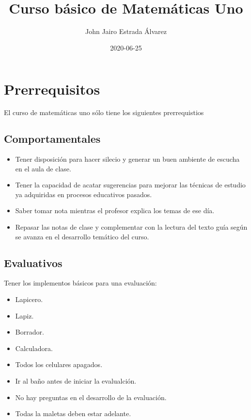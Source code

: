 \documentclass[]{book}
\title{Curso básico de Matemáticas Uno}
\author{John Jairo Estrada Álvarez}
\date{2020-06-25}
\theoremstyle{definition}
\theoremstyle{definition}
\theoremstyle{definition}
\theoremstyle{remark}
\begin{document}
\maketitle

{
\setcounter{tocdepth}{1}
\tableofcontents
}
\hypertarget{prerrequisitos}{%
\chapter{Prerrequisitos}\label{prerrequisitos}}

El curso de matemáticas uno sólo tiene los siguientes prerrequistios

\hypertarget{comportamentales}{%
\section{Comportamentales}\label{comportamentales}}

\begin{itemize}
\item
  Tener disposición para hacer silecio y generar un buen ambiente de escucha en el aula de clase.
\item
  Tener la capacidad de acatar sugerencias para mejorar las técnicas de estudio ya adquiridas en procesos educativos pasados.
\item
  Saber tomar nota mientras el profesor explica los temas de ese día.
\item
  Repasar las notas de clase y complementar con la lectura del texto guía
  según se avanza en el desarrollo temático del curso.
\end{itemize}

\hypertarget{evaluativos}{%
\section{Evaluativos}\label{evaluativos}}

Tener los implementos básicos para una evaluación:

\begin{itemize}
\item
  Lapicero.
\item
  Lapiz.
\item
  Borrador.
\item
  Calculadora.
\item
  Todos los celulares apagados.
\item
  Ir al baño antes de iniciar la evalualción.
\item
  No hay preguntas en el desarrollo de la evaluación.
\item
  Todas la maletas deben estar adelante.
\end{itemize}
\end{document}
